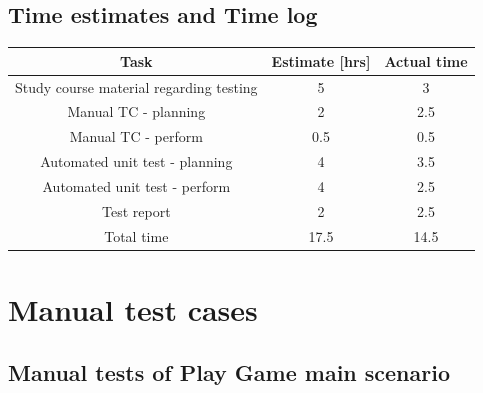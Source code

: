 \documentclass[12pt, letterpaper]{article}
\begin{document}
\subsection{Time estimates and Time log}
\begin{center}
	\begin{tabular}{|c|c|c|} 
		\hline
		Task & Estimate [hrs] & Actual time \\ [0.5ex] 
		\hline\hline
		Study course material regarding testing & 5 & 3 \\ 
		\hline
		Manual TC - planning & 2 & 2.5 \\
		\hline 
		Manual TC - perform & 0.5 & 0.5 \\ 
		\hline
		Automated unit test - planning & 4 & 3.5 \\ 
		\hline 		
		Automated unit test - perform & 4 & 2.5 \\
		\hline
		Test report & 2 & 2.5 \\
		\hline
		Total time & 17.5 & 14.5\\ [1ex]
		\hline
		
	\end{tabular}
\end{center}
\newpage
\section{Manual test cases}
\subsection{Manual tests of Play Game main scenario}
\end{document}

